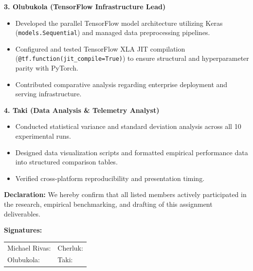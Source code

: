 \documentclass[11pt, a4paper]{article}
\begin{document}
\vspace{0.5em}
\noindent \textbf{3. Olubukola (TensorFlow Infrastructure Lead)}
\begin{itemize}
    \item Developed the parallel TensorFlow model architecture utilizing Keras (\texttt{models.Sequential}) and managed data preprocessing pipelines.
    \item Configured and tested TensorFlow XLA JIT compilation (\texttt{@tf.function(jit\_compile=True)}) to ensure structural and hyperparameter parity with PyTorch.
    \item Contributed comparative analysis regarding enterprise deployment and serving infrastructure.
\end{itemize}

\vspace{0.5em}
\noindent \textbf{4. Taki (Data Analysis \& Telemetry Analyst)}
\begin{itemize}
    \item Conducted statistical variance and standard deviation analysis across all 10 experimental runs.
    \item Designed data visualization scripts and formatted empirical performance data into structured comparison tables.
    \item Verified cross-platform reproducibility and presentation timing.
\end{itemize}

\vspace{2em}
\noindent \textbf{Declaration:} We hereby confirm that all listed members actively participated in the research, empirical benchmarking, and drafting of this assignment deliverables.

\vspace{1.5cm}
\noindent \textbf{Signatures:}
\vspace{0.8cm}

\noindent 
\begin{tabular}{ll}
    Michael Rivas: \underline{\hspace{5cm}} & Cherluk: \underline{\hspace{5cm}} \\[1cm]
    Olubukola: \underline{\hspace{5cm}} & Taki: \underline{\hspace{5cm}} \\
\end{tabular}
\end{document}
